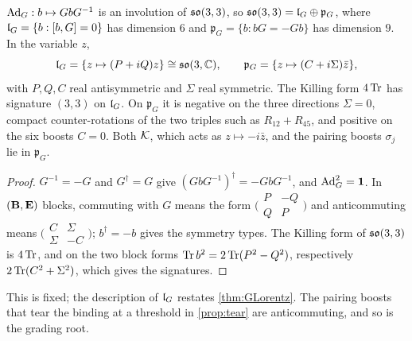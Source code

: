 \begin{proposition}
\label{bf:lp}
$\operatorname{Ad}_G:b\mapsto GbG^{-1}$ is an involution of $\mathfrak{so}(3,3)$, so $\mathfrak{so}(3,3)=\mathfrak l_G\oplus\mathfrak p_G$, where $\mathfrak l_G=\{b:[b,G]=0\}$ has dimension $6$ and
$\mathfrak p_G=\{b:bG=-Gb\}$ has dimension $9$. In the variable $z$,
\[
\mathfrak l_G=\{z\mapsto(P+iQ)z\}\cong\mathfrak{so}(3,\mathbb{C}),\qquad \mathfrak p_G=\{z\mapsto(C+i\Sigma)\bar z\},
\]
with $P,Q,C$ real antisymmetric and $\Sigma$ real symmetric. The Killing form $4\operatorname{Tr}$ has signature $(3,3)$ on $\mathfrak l_G$. On $\mathfrak p_G$ it is
negative on the three directions $\Sigma=0$, compact counter-rotations of the two triples such as $R_{12}+R_{45}$, and positive on the six boosts
$C=0$. Both $\mathcal K$, which acts as $z\mapsto-i\bar z$, and the pairing boosts $\sigma_j$ lie in $\mathfrak p_G$.
\end{proposition}

\begin{proof}
$G^{-1}=-G$ and $G^\dagger=G$ give $(GbG^{-1})^\dagger=-GbG^{-1}$, and $\operatorname{Ad}_G^2=\mathbf 1$. In $(\mathbf B,\mathbf E)$ blocks, commuting with $G$ means the form
$\bigl(\begin{smallmatrix}P&-Q\\Q&P\end{smallmatrix}\bigr)$ and anticommuting means $\bigl(\begin{smallmatrix}C&\Sigma\\\Sigma&-C\end{smallmatrix}\bigr)$;
$b^\dagger=-b$ gives the symmetry types. The Killing form of $\mathfrak{so}(3,3)$ is $4\operatorname{Tr}$, and on the two block forms $\operatorname{Tr} b^2=2\operatorname{Tr}(P^2-Q^2)$, respectively $2\operatorname{Tr}(C^2+\Sigma^2)$, which gives the signatures.
\end{proof}

This is fixed; the description of $\mathfrak l_G$ restates \cref{thm:GLorentz}. The pairing boosts that tear the binding at a threshold in \cref{prop:tear}
are anticommuting, and so is the grading root.

